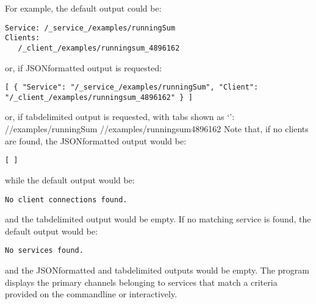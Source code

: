 For example, the default output could be:
\outputBegin{}
\begin{verbatim}
Service: /_service_/examples/runningSum
Clients:
   /_client_/examples/runningsum_4896162
\end{verbatim}
\outputEnd{}
or, if JSON\longDash{}formatted output is requested:
\outputBegin{}
\begin{verbatim}
[ { "Service": "/_service_/examples/runningSum", "Client":
"/_client_/examples/runningsum_4896162" } ]
\end{verbatim}
\outputEnd{}
or, if tab\longDash{}delimited output is requested, with tabs shown as `\tabSymbol':
\outputBegin{}
/\serviceName/examples/runningSum\pseudotab{}%
/\clientName/examples/runningsum\textunderscore{}4896162
\outputEnd{}
Note that, if no clients are found, the JSON\longDash{}formatted output would be:
\outputBegin{}
\begin{verbatim}
[ ]
\end{verbatim}
\outputEnd{}
while the default output would be:
\outputBegin{}
\begin{verbatim}
No client connections found.
\end{verbatim}
\outputEnd{}
and the tab\longDash{}delimited output would be empty.
If no matching service is found, the default output would be:
\outputBegin{}
\begin{verbatim}
No services found.
\end{verbatim}
\outputEnd{}
and the JSON\longDash{}formatted and tab\longDash{}delimited outputs would be empty.
The program  displays the primary channels belonging to
services that match a criteria provided on the command\longDash{}line or interactively.\\

